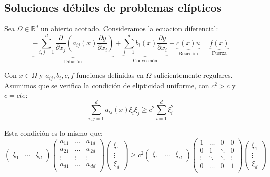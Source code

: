 	\subsection{Soluciones débiles de problemas elípticos}
	Sea $\Omega\in \mathbb{R}^d$ un abierto acotado. Consideramos la ecuacion diferencial:
	$$\underbrace{-\sum_{i,j=1}^d \frac{\partial}{\partial x_j}(a_{ij}(x)\frac{\partial y}{\partial x_i})}_{\text{Difusión}} + \underbrace{\sum_{i=1}^d b_i(x)\frac{\partial y}{\partial x_i}}_{\text{Convección}}+\underbrace{c(x) u}_\text{Reacción} = \underbrace{f(x)}_\text{Fuerza}$$
	
	Con $x\in\Omega$ y $a_{ij}, b_i, c, f$ funciones definidas en $\Omega$ suficientemente regulares. Asumimos que se verifica la condición de elipticidad uniforme, con $c^2>c$ y $c=cte$:
	$$\sum_{i,j=1}^d a_{ij}(x) \xi_i\xi_j \ge c^2 \sum_{i=1}^d \xi_i^2$$
	
	Esta condición es lo mismo que:
	\begin{equation*}
		\begin{pmatrix}
			\xi_1 & \hdots & \xi_d
		\end{pmatrix}
		\begin{pmatrix}
			a_{11} & \hdots & a_{1d}\\
			a_{21} & \hdots & a_{2d}\\
			\vdots & \vdots & \vdots \\
			a_{d1} & \hdots & a_{dd}\\
		\end{pmatrix}
		\begin{pmatrix}
			\xi_1\\
			\vdots
			\\\xi_d
		\end{pmatrix}\ge
		c^2
		\begin{pmatrix}
			\xi_1 & \hdots & \xi_d
		\end{pmatrix}
		\begin{pmatrix}
			1 & \hdots & 0 & 0\\
			0 & 1 & \ddots & 0\\
			\vdots & \ddots & \ddots & \vdots\\
			0 & \hdots & 0 & 1\\
		\end{pmatrix}
		\begin{pmatrix}
			\xi_1\\
			\vdots
			\\\xi_d
		\end{pmatrix}
	\end{equation*}
	
